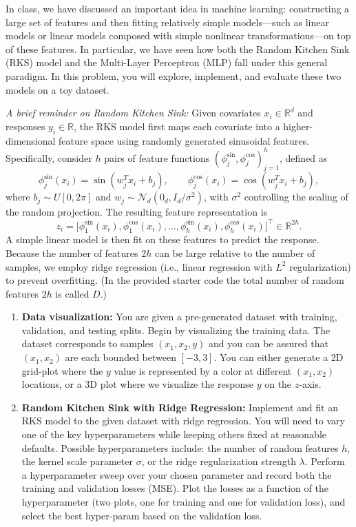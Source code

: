 \documentclass{article}
\newcounter{exercise}[section]
\newcounter{code}[section]
\begin{document}
\begin{exercise}[]
  In class, we have discussed an important idea in machine learning: constructing a large set of features and then fitting relatively simple models---such as linear models or linear models composed with simple nonlinear transformations---on top of these features. In particular, we have seen how both the Random Kitchen Sink (RKS) model and the Multi-Layer Perceptron (MLP) fall under this general paradigm. In this problem, you will explore, implement, and evaluate these two models on a toy dataset.

  \textit{A brief reminder on Random Kitchen Sink:} Given covariates $x_i\in\mathbb R^d$ and responses $y_i\in\mathbb R$, the RKS model first maps each covariate into a higher-dimensional feature space using randomly generated sinusoidal features. Specifically, consider $h$ pairs of feature functions $(\phi_j^{\sin},\phi_j^{\cos})_{j=1}^h$, defined as
  \[
    \phi_j^{\sin}(x_i)=\sin(w_j^Tx_i+b_j),\qquad \phi_j^{\cos}(x_i)=\cos(w_j^Tx_i+b_j),
  \]
  where $b_j\sim U[0,2\pi]$ and $w_j\sim\mathcal N_d(0_d,I_d/\sigma^2)$, with $\sigma^2$ controlling the scaling of the random projection. The resulting feature representation is
  \[
    z_i=\big[\phi_1^{\sin}(x_i),\phi_1^{\cos}(x_i),\ldots,\phi_h^{\sin}(x_i),\phi_h^{\cos}(x_i)\big]^\top\in\mathbb R^{2h}.
  \]
  A simple linear model is then fit on these features to predict the response. Because the number of features $2h$ can be large relative to the number of samples, we employ ridge regression (i.e., linear regression with $L^2$ regularization) to prevent overfitting. (In the provided starter code the total number of random features $2h$ is called $D$.)
  \begin{enumerate}[label=(\alph*)]
    \item \textbf{Data visualization:} You are given a pre-generated dataset with training, validation, and testing splits. Begin by visualizing the training data. The dataset corresponds to samples $(x_1,x_2,y)$ and you can be assured that $(x_1,x_2)$ are each bounded between $[-3,3]$. You can either generate a 2D grid-plot where the $y$ value is represented by a color at different $(x_1,x_2)$ locations, or a 3D plot where we visualize the response $y$ on the $z$-axis.
    \item \textbf{Random Kitchen Sink with Ridge Regression:} Implement and fit an RKS model to the given dataset with ridge regression. You will need to vary one of the key hyperparameters while keeping others fixed at reasonable defaults. Possible hyperparameters include: the number of random features $h$, the kernel scale parameter $\sigma$, or the ridge regularization strength $\lambda$. Perform a hyperparameter sweep over your chosen parameter and record both the training and validation losses (MSE). Plot the losses as a function of the hyperparameter (two plots, one for training and one for validation loss), and select the best hyper-param based on the validation loss.

\end{enumerate}
\end{exercise}
\end{document}

